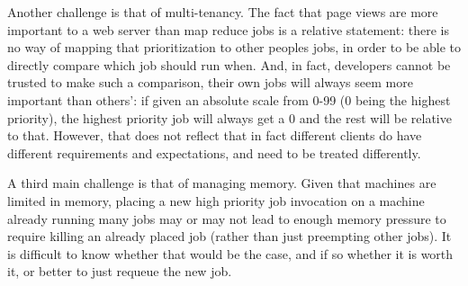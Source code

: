 Another challenge is that of multi-tenancy. The fact that page views are more
important to a web server than map reduce jobs is a relative statement: there is
no way of mapping that prioritization to other peoples jobs, in order to be able
to directly compare which job should run when. And, in fact, developers cannot
be trusted to make such a comparison, their own jobs will always seem more
important than others': if given an absolute scale from 0-99 (0 being the
highest priority), the highest priority job will always get a 0 and the rest
will be relative to that. However, that does not reflect that in fact different
clients do have different requirements and expectations, and need to be treated
differently.

A third main challenge is that of managing memory. Given that machines are
limited in memory, placing a new high priority job invocation on a machine
already running many jobs may or may not lead to enough memory pressure to
require killing an already placed job (rather than just preempting other jobs).
It is difficult to know whether that would be the case, and if so whether it is
worth it, or better to just requeue the new job.

 
